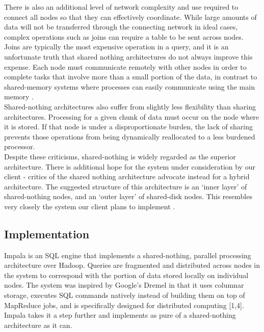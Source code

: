 \documentclass[onecolumn, draftclsnofoot,10pt, compsoc]{IEEEtran}
\begin{document}
\indent There is also an additional level of network complexity and use required to connect all nodes so that they can effectively coordinate. While large amounts of data will not be transferred through the connecting network in ideal cases, complex operations such as joins can require a table to be sent across nodes. Joins are typically the most expensive operation in a query, and it is an unfortunate truth that shared nothing architectures do not always improve this expense. Each node must communicate remotely with other nodes in order to complete tasks that involve more than a small portion of the data, in contrast to shared-memory systems where processes can easily communicate using the main memory \cite{MuchAdo}. \\

\indent Shared-nothing architectures also suffer from slightly less flexibility than sharing architectures. Processing for a given chunk of data must occur on the node where it is stored. If that node is under a disproportionate burden, the lack of sharing prevents those operations from being dynamically reallocated to a less burdened processor. \\

\indent Despite these criticisms, shared-nothing is widely regarded as the superior architecture. There is additional hope for the system under consideration by our client - critics of the shared nothing architecture advocate instead for a hybrid architecture. The suggested structure of this architecture is an ‘inner layer’ of shared-nothing nodes, and an ‘outer layer’ of shared-disk nodes. This resembles very closely the system our client plans to implement \cite{MuchAdo}.\\

    \subsection{Implementation}
    \indent Impala is an SQL engine that implements a shared-nothing, parallel processing architecture over Hadoop. Queries are fragmented and distributed across nodes in the system to correspond with the portion of data stored locally on individual nodes. The system was inspired by Google’s Dremel in that it uses columnar storage, executes SQL commands natively instead of building them on top of MapReduce jobs, and is specifically designed for distributed computing [1,4]. Impala takes it a step further and implements as pure of a shared-nothing architecture as it can. \\
\end{document}
